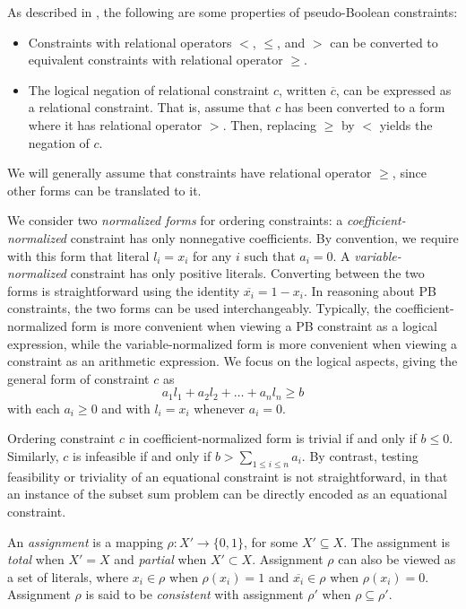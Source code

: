 \documentclass{fmcad}
\begin{document}
As described in \cite{gocht2022certifying}, the following are some properties of pseudo-Boolean
constraints:
\begin{itemize}
\item Constraints with relational operators $<$, $\leq$, and $>$ can be converted to equivalent
  constraints with relational operator $\geq$.
\item The logical negation of relational constraint $c$, written $\overline{c}$, can be expressed
  as a relational constraint. That is, assume that $c$ has been converted to a form where it has
  relational operator $>$. Then, replacing $\geq$ by $<$ yields the negation of $c$.
\end{itemize}

We will generally assume that constraints have relational operator $\geq$, since other forms can
be translated to it.

We consider two \textit{normalized forms} for ordering constraints: a \textit{coefficient-normalized}
constraint has only nonnegative coefficients. By convention, we require with this form that literal
$l_i = x_i$ for any $i$ such that $a_i = 0$. A \textit{variable-normalized} constraint has only
positive literals. Converting between the two forms is straightforward using the identity
$\overline{x_i} = 1 - x_i$. In reasoning about PB constraints, the two forms can be used
interchangeably. Typically, the coefficient-normalized form is more convenient when viewing a PB
constraint as a logical expression, while the variable-normalized form is more convenient when
viewing a constraint as an arithmetic expression. We focus on the logical aspects, giving
the general form of constraint $c$ as
\begin{equation}
  \label{eq:gen-constraint}
  a_1 l_1 + a_2 l_2 + \dots + a_n l_n \geq b
\end{equation}
with each $a_i \geq 0$ and with $l_i = x_i$ whenever $a_i = 0$.

Ordering constraint $c$ in coefficient-normalized form is trivial if and only if $b \leq 0$.
Similarly, $c$ is infeasible if and only if $b > \sum_{1 \leq i \leq n} a_i$. By contrast, testing
feasibility or triviality of an equational constraint is not straightforward, in that an instance
of the subset sum problem \cite{garey1972optimal} can be directly encoded as an equational constraint.

An \textit{assignment} is a mapping $\rho : X' \rightarrow \{0, 1\}$, for some $X' \subseteq X$.
The assignment is \textit{total} when $X' = X$ and \textit{partial} when $X' \subset X$. Assignment
$\rho$ can also be viewed as a set of literals, where $x_i \in \rho$ when $\rho(x_i) = 1$ and
$\overline{x_i} \in \rho$ when $\rho(x_i) = 0$. Assignment $\rho$ is said to be \textit{consistent}
with assignment $\rho'$ when $\rho \subseteq \rho'$.
\end{document}

